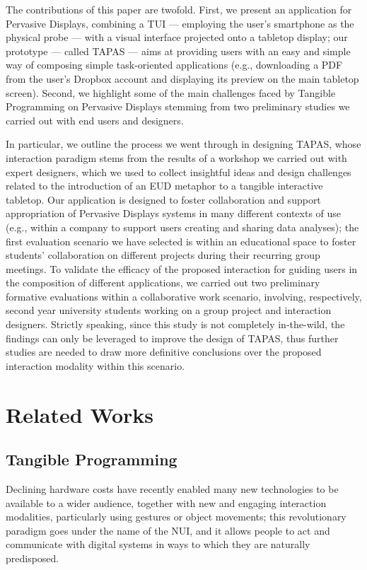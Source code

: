 The contributions of this paper are twofold. First, we present an application for Pervasive Displays, combining a \ac{TUI} --- employing the user's smartphone as the physical probe --- with a visual interface projected onto a tabletop display; our prototype --- called \ac{TAPAS} \cite{Turchi:2015dr,Turchi:2015kr} --- aims at providing users with an easy and simple way of composing simple task-oriented applications (e.g., downloading a PDF from the user's Dropbox account and displaying its preview on the main tabletop screen). Second, we highlight some of the main challenges faced by Tangible Programming on Pervasive Displays stemming from two preliminary studies we carried out with end users and designers.

In particular, we outline the process we went through in designing \acs{TAPAS}, whose interaction paradigm stems from the results of a workshop we carried out with expert designers, which we used to collect insightful ideas and design challenges related to the introduction of an \ac{EUD} metaphor to a tangible interactive tabletop. Our application is designed to foster collaboration and support appropriation of Pervasive Displays systems in many different contexts of use (e.g., within a company to support users creating and sharing data analyses); the first evaluation scenario we have selected is within an educational space to foster students' collaboration on different projects during their recurring group meetings. To validate the efficacy of the proposed interaction for guiding users in the composition of different applications, we carried out two preliminary formative evaluations within a collaborative work scenario, involving, respectively, second year university students working on a group project and interaction designers. Strictly speaking, since this study is not completely in-the-wild, the findings can only be leveraged to improve the design of \acs{TAPAS}, thus further studies are needed to draw more definitive conclusions over the proposed interaction modality within this scenario.

\section{Related Works}

\subsection{Tangible Programming}
Declining hardware costs have recently enabled many new technologies to be available to a wider audience, together with new and engaging interaction modalities, particularly using gestures or object movements; this revolutionary paradigm goes under the name of the \ac{NUI}, and it allows people to act and communicate with digital systems in ways to which they are naturally predisposed.

